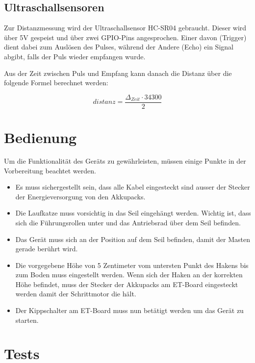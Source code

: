 \documentclass[a4paper]{report}
\begin{document}
\subsection{Ultraschallsensoren}
\label{ssec:UltrasonicSensorInterface}

Zur Distanzmessung wird der Ultraschallsensor HC-SR04 gebraucht. Dieser wird über 5V gespeist und über zwei GPIO-Pins angesprochen. Einer davon (Trigger) dient dabei zum Auslösen des Pulses, während der Andere (Echo) ein Signal abgibt, falls der Puls wieder empfangen wurde.

Aus der Zeit zwischen Puls und Empfang kann danach die Distanz über die folgende Formel berechnet werden:

\begin{equation*}
	distanz = \frac{\Delta_{Zeit} \cdot 34300}{2}
\end{equation*}

\section{Bedienung}
\label{sec:Bedienung}
Um die Funktionalität des Geräts zu gewährleisten, müssen einige Punkte in der Vorbereitung beachtet werden.

\begin{itemize}
	\item Es muss sichergestellt sein, dass alle Kabel eingesteckt sind ausser der Stecker der Energieversorgung von den Akkupacks.
	\item Die Laufkatze muss vorsichtig in das Seil eingehängt werden. Wichtig ist, dass sich die Führungsrollen unter und das Antriebsrad über dem Seil befinden.
	\item Das Gerät muss sich an der Position auf dem Seil befinden, damit der Masten gerade berührt wird.
	\item Die vorgegebene Höhe von 5 Zentimeter vom untersten Punkt des Hakens bis zum Boden muss eingestellt werden. Wenn sich der Haken an der korrekten Höhe befindet, muss der Stecker der Akkupacks am ET-Board eingesteckt werden damit der Schrittmotor die hält.
	\item Der Kippschalter am ET-Board muss nun betätigt werden um das Gerät zu starten.
\end{itemize}

\section{Tests}
\label{sec:TestsPrototyp}
\end{document}

